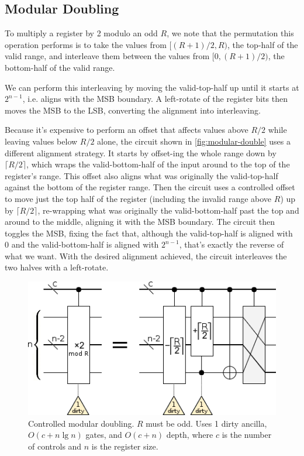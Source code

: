 \documentclass[twocolumn,longbibliography]{quantumarticle}
\begin{document}
\subsection{Modular Doubling}

To multiply a register by 2 modulo an odd $R$, we note that the permutation this operation performs is to take the values from $[(R+1)/2, R)$, the top-half of the valid range, and interleave them between the values from $[0, (R+1)/2)$, the bottom-half of the valid range.

We can perform this interleaving by moving the valid-top-half up until it starts at $2^{n-1}$, i.e. aligns with the MSB boundary.
A left-rotate of the register bits then moves the MSB to the LSB, converting the alignment into interleaving.

Because it's expensive to perform an offset that affects values above $R/2$ while leaving values below $R/2$ alone, the circuit shown in \autoref{fig:modular-double} uses a different alignment strategy.
It starts by offset-ing the whole range down by $\lceil R/2 \rceil$, which wraps the valid-bottom-half of the input around to the top of the register's range.
This offset also aligns what was originally the valid-top-half against the bottom of the register range.
Then the circuit uses a controlled offset to move just the top half of the register (including the invalid range above $R$) up by $\lceil R/2 \rceil$, re-wrapping what was originally the valid-bottom-half past the top and around to the middle, aligning it with the MSB boundary.
The circuit then toggles the MSB, fixing the fact that, although the valid-top-half is aligned with 0 and the valid-bottom-half is aligned with $2^{n-1}$, that's exactly the reverse of what we want.
With the desired alignment achieved, the circuit interleaves the two halves with a left-rotate.


\begin{figure}
  \centering
  \includegraphics[width=\linewidth]{assets/controlled-modular-double.png}
  \caption{
    Controlled modular doubling.
    $R$ must be odd.
    Uses 1 dirty ancilla, $O(c + n \lg n)$ gates, and $O(c + n)$ depth, where $c$ is the number of controls and $n$ is the register size.
  }
  \label{fig:modular-double}
\end{figure}
\end{document}
